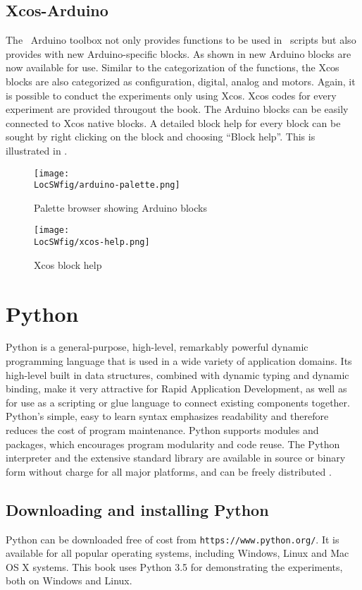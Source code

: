 \subsection{Xcos-Arduino}
The \scilab\ Arduino toolbox not only provides functions to be used in
\scilab\ scripts but also provides with new Arduino-specific blocks. As
shown in  new Arduino blocks are now available
for use.  Similar to the categorization of the functions, the Xcos
blocks are also categorized as configuration, digital, analog and
motors. Again, it is possible to conduct the experiments only using
Xcos. Xcos codes for every experiment are provided througout the
book. The Arduino blocks can be easily connected to Xcos native
blocks. A detailed block help for every block can be sought by right
clicking on the block and choosing ``Block help''. This is illustrated
in .

\begin{figure}
      \centering
      \texttt{[image: \\LocSWfig/arduino-palette.png]}
      \caption{Palette browser showing Arduino blocks}
      \label{arduino-palette}
\end{figure}

\begin{figure}
      \centering
      \texttt{[image: \\LocSWfig/xcos-help.png]}
      \caption{Xcos block help}
      \label{blk-help}
\end{figure}

\section{Python}
\label{sec:python-start}
Python is a general-purpose, high-level, remarkably powerful dynamic programming language 
that is used in a wide variety of application domains. Its high-level built in data structures, 
combined with dynamic typing and dynamic binding, make it very attractive for Rapid Application Development, 
as well as for use as a scripting or glue language to connect existing components together. 
Python's simple, easy to learn syntax emphasizes readability and therefore reduces the cost of program maintenance. 
Python supports modules and packages, which encourages program modularity and code reuse. 
The Python interpreter and the extensive standard library are available in source or binary form without 
charge for all major platforms, and can be freely distributed \cite{python-ref}.


\subsection{Downloading and installing Python}\label{python-installation}
Python can be downloaded free of cost from {\tt https://www.python.org/}. It is
available for all popular operating systems, including Windows, Linux
and Mac OS X systems.  This book uses Python 3.5 for demonstrating
the experiments, both on Windows and Linux.


